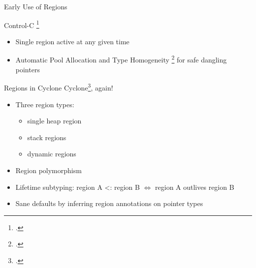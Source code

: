 \documentclass[aspectratio=169]{beamer}
\begin{document}
\begin{frame}{Early Use of Regions}
{Control-C \footcite{kowshik_ensuring_2002}
    \vspace{-0.1in}
    \begin{itemize}
        \item Single region active at any given time
        \item Automatic Pool Allocation and Type Homogeneity \footcite{dhurjati_memory_2003} for safe dangling pointers 
    \end{itemize}
}
    \vspace{0.2in}
\end{frame}

\begin{frame}{Regions in Cyclone}
    Cyclone\footcite{grossman_region-based_2002}, again!
    \begin{itemize}[<+->]
        \item Three region types:
            \begin{itemize}
                \item single \alert{heap} region 
                \item \alert{stack} regions 
                \item \alert{dynamic} regions 
            \end{itemize}
        \item Region polymorphism
        \item Lifetime subtyping: region A <: region B $\Leftrightarrow$ region A \alert{outlives} region B
        \item Sane defaults by inferring region annotations on pointer types  %
    \end{itemize}
    \vspace{0.1in}
\end{frame}
\end{document}
